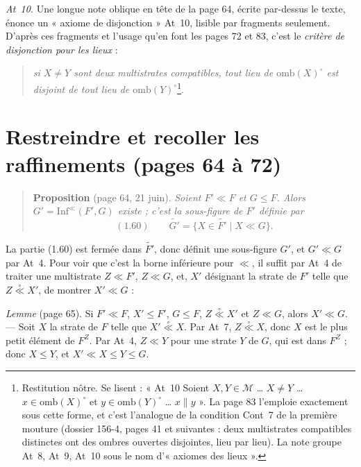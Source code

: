\documentclass[11pt,a4paper]{article}
\begin{document}
\emph{At~10.} Une longue note oblique en tête de la page 64, écrite par-dessus le
texte, énonce un « axiome de disjonction » At~10, lisible par fragments seulement.
D'après ces fragments et l'usage qu'en font les pages 72 et 83, c'est le
\emph{critère de disjonction pour les lieux} :
\begin{quote}
\emph{si $X \neq Y$ sont deux multistrates compatibles, tout lieu de
$\mathrm{omb}(X)^{\circ}$ est disjoint de tout lieu de
$\mathrm{omb}(Y)^{\circ}$}\footnote{Restitution nôtre. Se lisent : « At~10 Soient
$X, Y \in \mathcal{M}$ … $X \neq Y$ … $x \in \mathrm{omb}(X)^{\circ}$ et
$y \in \mathrm{omb}(Y)^{\circ}$ … $x \parallel y$ ». La page 83 l'emploie
exactement sous cette forme, et c'est l'analogue de la condition Cont~7 de la
première mouture (dossier 156-4, pages 41 et suivantes : deux multistrates
compatibles distinctes ont des ombres ouvertes disjointes, lieu par lieu). La
note groupe At~8, At~9, At~10 sous le nom d'« axiomes des lieux ».}.
\end{quote}

\section*{Restreindre et recoller les raffinements (pages 64 à 72)}

\begin{quote}
\textbf{Proposition} (page 64, 21 juin). \emph{Soient $F' \ll F$ et $G \leq F$.
Alors $G' = \mathrm{Inf}^{\ll}(F', G)$ existe ; c'est la sous-figure de $F'$
définie par}
\[
(1.60) \qquad \widetilde{G'} = \lbrace X \in \widetilde{F'} \mid X \ll G \rbrace .
\]
\end{quote}


La partie (1.60) est fermée dans $\widetilde{F'}$, donc définit une sous-figure
$G'$, et $G' \ll G$ par At~4. Pour voir que c'est la borne inférieure pour
$\ll$, il suffit par At~4 de traiter une multistrate $Z \ll F'$, $Z \ll G$, et,
$X'$ désignant la strate de $F'$ telle que $Z \mathrel{\overset{\circ}{\ll}} X'$,
de montrer $X' \ll G$ :

\emph{Lemme} (page 65). Si $F' \ll F$, $X' \leq F'$, $G \leq F$, $Z
\mathrel{\overset{\circ}{\ll}} X'$ et $Z \ll G$, alors $X' \ll G$. --- Soit $X$
la strate de $F$ telle que $X' \mathrel{\overset{\circ}{\ll}} X$. Par At~7, $Z
\mathrel{\overset{\circ}{\ll}} X$, donc $X$ est le plus petit élément de
$F^{Z}$. Par At~4, $Z \ll Y$ pour une strate $Y$ de $G$, qui est dans $F^{Z}$ ;
donc $X \leq Y$, et $X' \ll X \leq Y \leq G$.
\end{document}
